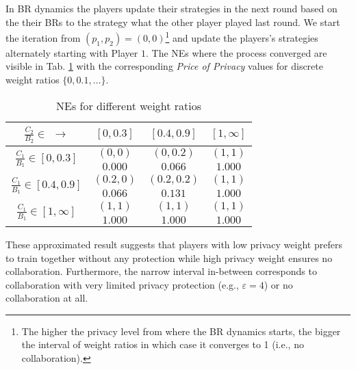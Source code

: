 \documentclass[USenglish,oneside,twocolumn]{article}
\theoremstyle{plain}
\begin{document}
    In BR dynamics the players update their strategies in the next round based on the their BRs to the strategy what the other player played last round. We start the iteration from $(p_1,p_2)=(0,0)$\footnote{The higher the privacy level from where the BR dynamics starts, the bigger the interval of weight ratios in which case it converges to 1 (i.e., no collaboration).} and update the players's strategies alternately starting with Player $1$. The NEs where the process converged are visible in Tab. \ref{tab:exact} with the corresponding \textit{Price of Privacy} values for discrete weight ratios $\{0,0.1,\dots\}$.
    
    \vspace{-0.25cm}
    \begin{table}[h]
        \centering
        \begin{tabular}{|c||c|c|c|}
            \hline
            $\frac{C_2}{B_2}\in$ $\rightarrow$ & $[0,0.3]$ & $[0.4,0.9]$ & $[1,\infty]$ \\
            \hline
            \hline
            \multirow{2}{*}{$\frac{C_1}{B_1}\in[0,0.3]$} & $(0,0)$ & $(0,0.2)$ & $(1,1)$ \\
            & $\num{0.000}$ & $\num{0.066}$ & $\num{1.000}$ \\
            \hline
            \multirow{2}{*}{$\frac{C_1}{B_1}\in[0.4,0.9]$} & $(0.2,0)$ & $(0.2,0.2)$ & $(1,1)$ \\
            & $\num{0.066}$ & $\num{0.131}$ & $\num{1.000}$ \\
            \hline
            \multirow{2}{*}{$\frac{C_1}{B_1}\in[1,\infty]$} & $(1,1)$ & $(1,1)$ & $(1,1)$ \\
            & $\num{1.000}$ & $\num{1.000}$ & $\num{1.000}$ \\
            \hline
        \end{tabular}
        \vspace{0.1cm}
        \caption{NEs for different weight ratios}
        \label{tab:exact}
    \end{table}
    \vspace{-1cm}
    
    These approximated result suggests that players with low privacy weight prefers to train together without any protection while high privacy weight ensures no collaboration. Furthermore, the narrow interval in-between corresponds to collaboration with very limited privacy protection (e.g., $\varepsilon=4$) or no collaboration at all. 

    \vspace{-0.5cm}
\end{document}
